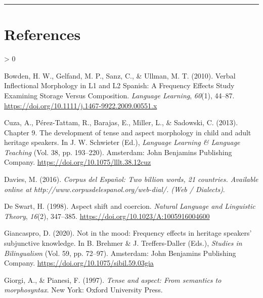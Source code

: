 \documentclass[
  english,
  man,floatsintext]{apa6}
\newlength{\cslhangindent}
\newenvironment{CSLReferences}[2] %
 {%
  \setlength{\parindent}{0pt}
  \ifodd #1 \everypar{\setlength{\hangindent}{\cslhangindent}}\ignorespaces\fi
  \ifnum #2 > 0
  \setlength{\parskip}{#2\baselineskip}
  \fi
 }%
 {}
\begin{document}
\begin{center}\rule{0.5\linewidth}{0.5pt}\end{center}

\hypertarget{references}{%
\section{References}\label{references}}

\setlength{\parindent}{-0.5in}
\setlength{\leftskip}{0.5in}

\hypertarget{refs}{}
\begin{CSLReferences}{1}{0}
\leavevmode\hypertarget{ref-bowden_verbal_2010}{}%
Bowden, H. W., Gelfand, M. P., Sanz, C., \& Ullman, M. T. (2010). Verbal {Inflectional} {Morphology} in {L1} and {L2} {Spanish}: {A} {Frequency} {Effects} {Study} {Examining} {Storage} {Versus} {Composition}. \emph{Language Learning}, \emph{60}(1), 44--87. \url{https://doi.org/10.1111/j.1467-9922.2009.00551.x}

\leavevmode\hypertarget{ref-schwieter_chapter_2013}{}%
Cuza, A., Pérez-Tattam, R., Barajas, E., Miller, L., \& Sadowski, C. (2013). Chapter 9. {The} development of tense and aspect morphology in child and adult heritage speakers. In J. W. Schwieter (Ed.), \emph{Language {Learning} \& {Language} {Teaching}} (Vol. 38, pp. 193--220). Amsterdam: John Benjamins Publishing Company. \url{https://doi.org/10.1075/lllt.38.12cuz}

\leavevmode\hypertarget{ref-davies_corpus_2016}{}%
Davies, M. (2016). \emph{Corpus del {Español}: {Two} billion words, 21 countries. {Available} online at http://www.corpusdelespanol.org/web-dial/. ({Web} / {Dialects})}.

\leavevmode\hypertarget{ref-de_swart_aspect_1998}{}%
De Swart, H. (1998). Aspect shift and coercion. \emph{Natural Language and Linguistic Theory}, \emph{16}(2), 347--385. \url{https://doi.org/10.1023/A:1005916004600}

\leavevmode\hypertarget{ref-brehmer_not_2020}{}%
Giancaspro, D. (2020). Not in the mood: {Frequency} effects in heritage speakers' subjunctive knowledge. In B. Brehmer \& J. Treffers-Daller (Eds.), \emph{Studies in {Bilingualism}} (Vol. 59, pp. 72--97). Amsterdam: John Benjamins Publishing Company. \url{https://doi.org/10.1075/sibil.59.03gia}

\leavevmode\hypertarget{ref-giorgi_tense_1997}{}%
Giorgi, A., \& Pianesi, F. (1997). \emph{Tense and aspect: From semantics to morphosyntax}. New York: Oxford University Press.


\end{CSLReferences}
\end{document}
